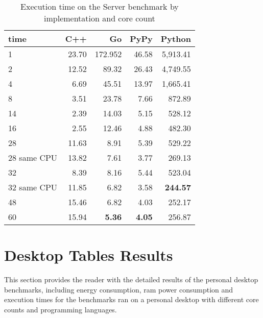 \begin{table}[h]
    \centering
    \begin{tabular}{lrrrr}
        \hline
        time         & C++             & Go            & PyPy          & Python     \\
        \hline
        1            & 23.70           & 172.952       & 46.58         & 5,913.41        \\
        2            & 12.52           & 89.32         & 26.43         & 4,749.55        \\
        4            & 6.69            & 45.51         & 13.97         & 1,665.41        \\
        8	         & 3.51  	       & 23.78 	       & 7.66          & 872.89          \\
        14           & 2.39            & 14.03         & 5.15          & 528.12          \\
        16           & 2.55            & 12.46         & 4.88          & 482.30          \\
        28           & 11.63           & 8.91          & 5.39          & 529.22          \\
        28 same CPU  & 13.82           & 7.61          & 3.77          & 269.13          \\
        32           & 8.39            & 8.16          & 5.44          & 523.04          \\
        32 same CPU  & 11.85           & 6.82          & 3.58          & \textbf{244.57} \\
        48           & 15.46           & 6.82          & 4.03          & 252.17          \\
        60           & 15.94           & \textbf{5.36} & \textbf{4.05} & 256.87          \\
        \hline
    \end{tabular}
\caption[Server - Execution Time]{Execution time on the Server benchmark by implementation and core count}
\label{tab:server-execution-time}
\end{table}

\chapter{Desktop Tables Results}
\label{chap:appendix-desktop-benchmarks}

This section provides the reader with the detailed results of the personal desktop benchmarks, including energy consumption, \gls{ram} power consumption and execution times for the benchmarks ran on a personal desktop with different core counts and programming languages.

